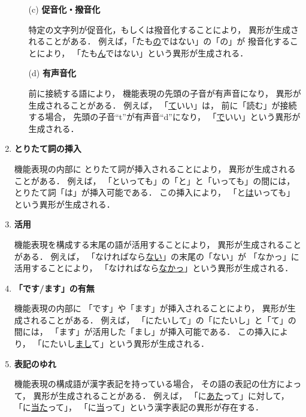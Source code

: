 \documentclass[japanese]{jnlp_1.3e}
\begin{document}
\begin{enumerate}
\begin{enumerate}
       \item[(c)] {\bf 促音化・撥音化}

                  特定の文字列が促音化，もしくは撥音化することにより，
                  異形が生成されることがある．
                  例えば，「たも\ul{の}ではない」の「の」が
                  撥音化することにより，
                  「たも\ul{ん}ではない」という異形が生成される．
                  
       \item[(d)] {\bf 有声音化}

                  前に接続する語により，
                  機能表現の先頭の子音が有声音になり，
                  異形が生成されることがある．
                  例えば，
                  「\ul{て}いい」は，
                  前に「読む」が接続する場合，
                  先頭の子音``t''が有声音``d''になり，
                  「\ul{で}いい」という異形が生成される．
      \end{enumerate}

\item {\bf とりたて詞の挿入}

      機能表現の内部に
      とりたて詞が挿入されることにより，
      異形が生成されることがある．
      例えば，
      「といっても」の「と」と「いっても」の間には，
      とりたて詞「は」が挿入可能である．
      この挿入により，
      「と\ul{は}いっても」という異形が生成される．
      
\item {\bf 活用}

      機能表現を構成する末尾の語が活用することにより，
      異形が生成されることがある．      
      例えば，
      「なければなら\ul{ない}」の末尾の「ない」が
      「なかっ」に活用することにより，
      「なければなら\ul{なかっ}」という異形が生成される．

\item {\bf 「です/ます」の有無}
      
      機能表現の内部に
      「です」や「ます」が挿入されることにより，
      異形が生成されることがある．
      例えば，
      「にたいして」の「にたいし」と「て」の間には，
      「ます」が活用した「まし」が挿入可能である．
      この挿入により，
      「にたいし\ul{まし}て」という異形が生成される．

\item {\bf 表記のゆれ}

      機能表現の構成語が漢字表記を持っている場合，
      その語の表記の仕方によって，
      異形が生成されることがある．
      例えば，
      「に\ul{あた}って」に対して，
      「に\ul{当た}って」，
      「に\ul{当}って」という漢字表記の異形が存在する．
\end{enumerate}
\end{document}
